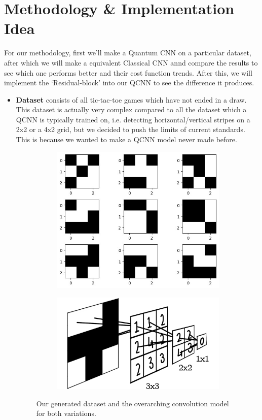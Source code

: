 \documentclass[a4paper]{article}
\begin{document}
\section*{Methodology \& Implementation Idea}

For our methodology, first we'll make a Quantum CNN on a particular dataset, after which we will make a equivalent Classical CNN annd compare the results to see which one performs better and their cost function trends. After this, we will implement the `Residual-block' into our QCNN to see the difference it produces. 
\begin{itemize}
\item \textbf{Dataset} consists of all tic-tac-toe games which have not ended in a draw. This dataset is actually very complex compared to all the dataset which a QCNN is typically trained on, i.e. detecting horizontal/vertical stripes on a 2x2 or a 4x2 grid, but we decided to push the limits of current standards. This is because we wanted to make a QCNN model never made before.

\begin{figure}[h]
\centering
\begin{subfigure}{.5\textwidth}
  \centering
\includegraphics[height = 0.5\textwidth]{assets/dataset.jpeg}
  \label{fig:sub1}
\end{subfigure}%
\begin{subfigure}{.5\textwidth}
  \centering
  \includegraphics[height=.5\linewidth]{assets/CCNN.png}
  \label{fig:sub2}
\end{subfigure}
\caption{Our generated dataset and the overarching convolution model for both variations.}
\label{fig:test}
\end{figure}


\end{itemize}
\end{document}
